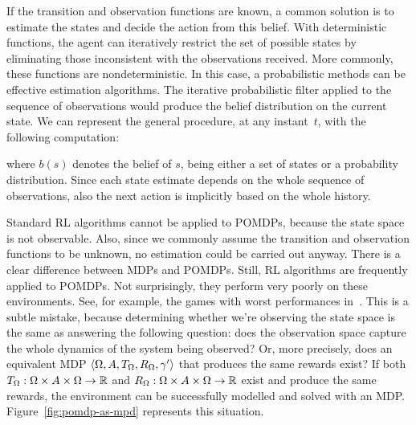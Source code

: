 If the transition and observation functions are known, a common solution is to
estimate the states and decide the action from this belief. With deterministic
functions, the agent can iteratively restrict the set of possible states by
eliminating those inconsistent with the observations received. More commonly,
these functions are nondeterministic. In this case, a probabilistic methods
can be effective estimation algorithms. The iterative probabilistic filter
applied to the sequence of observations would produce the belief distribution
on the current state.
We can represent the general procedure, at any instant~$t$, with the
following computation:
\begin{center}
\end{center}
where $b(s)$ denotes the belief of $s$, being either a set of states or a
probability distribution. Since each state estimate depends on the whole
sequence of observations, also the next action is implicitly based on the
whole history.

Standard RL algorithms cannot be applied to POMDPs, because the state space is
not observable. Also, since we commonly assume the transition and observation
functions to be unknown, no estimation could be carried out anyway.  There is
a clear difference between MDPs and POMDPs. Still, RL algorithms are
frequently applied to POMDPs. Not surprisingly, they perform very poorly on
these environments. See, for example, the games with worst performances
in~\cite{bib:atari-deepq-nature}. This is a subtle mistake, because
determining whether we're observing the state space is the same as answering
the following question: does the observation space capture the whole dynamics
of the system being observed? Or, more precisely, does an equivalent MDP
$\langle \Omega, A, T_\Omega, R_\Omega, \gamma' \rangle$ that produces the
same rewards exist? If both $T_\Omega: \Omega \times A \times \Omega \to \mathbb{R}$ and
$R_\Omega: \Omega \times A \times \Omega \to \mathbb{R}$ exist and produce the same
rewards, the environment can be successfully modelled and solved with an MDP.
Figure~\ref{fig:pomdp-as-mpd} represents this situation.

